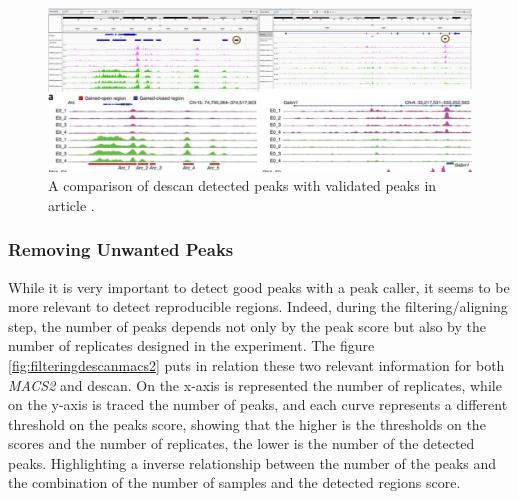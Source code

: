 \begin{figure}[H]
\centering
\includegraphics[width=\textwidth, keepaspectratio]{img/descan2/peaks.png}
\caption[DEScan2 peaks detection]{A comparison of \gls{descan} detected peaks with validated peaks in article \cite{Su2017}.}
\label{fig:peaksdescan}
\end{figure}

\subsubsection{Removing Unwanted Peaks}

While it is very important to detect good peaks with a peak caller, it seems to be more relevant to detect reproducible regions. 
Indeed, during the filtering/aligning step, the number of peaks depends not only by the peak score but also by the number of replicates designed in the experiment.
The figure \ref{fig:filteringdescanmacs2} puts in relation these two relevant information for both \textit{MACS2} and \gls{descan}. 
On the x-axis is represented the number of replicates, while on the y-axis is traced the number of peaks, and each curve represents a different threshold on the peaks score, showing that the higher is the thresholds on the scores and the number of replicates, the lower is the number of the detected peaks.
Highlighting a inverse relationship between the number of the peaks and the combination of the number of samples and the detected regions score.

